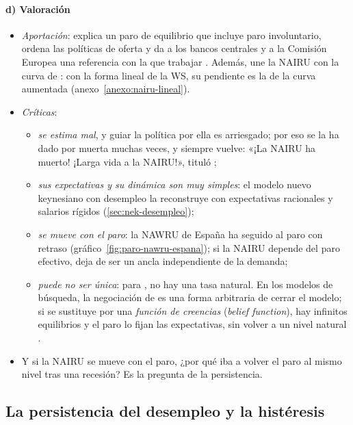 \documentclass[11pt]{article}
\begin{document}
\paragraph{d) Valoración}

\begin{itemize}
\item \emph{Aportación}: explica un paro de equilibrio que incluye paro involuntario, ordena las políticas de oferta y da a los bancos centrales y a la Comisión Europea una referencia con la que trabajar  . Además, une la NAIRU con la curva de : con la forma lineal de la WS, su pendiente es la de la curva aumentada (anexo~\ref{anexo:nairu-lineal}).
\item \emph{Críticas}:
  \begin{itemize}
  \item \emph{se estima mal}, y guiar la política por ella es arriesgado; por eso se la ha dado por muerta muchas veces, y siempre vuelve: «¡La NAIRU ha muerto! ¡Larga vida a la NAIRU!», tituló \textcite{Jimeno2018NAIRU};
  \item \emph{sus expectativas y su dinámica son muy simples}: el modelo nuevo keynesiano con desempleo la reconstruye con expectativas racionales y salarios rígidos (\ref{sec:nek-desempleo});
  \item \emph{se mueve con el paro}: la NAWRU de España ha seguido al paro con retraso (gráfico~\ref{fig:paro-nawru-espana}); si la NAIRU depende del paro efectivo, deja de ser un ancla independiente de la demanda;
  \item \emph{puede no ser única}: para \textcite{Farmer2010Expectations}, no hay una tasa natural. En los modelos de búsqueda, la negociación de  es una forma arbitraria de cerrar el modelo; si se sustituye por una \emph{función de creencias} (\emph{belief function}), hay infinitos equilibrios y el paro lo fijan las expectativas, sin volver a un nivel natural\nocite{Farmer2013Natural} .
  \end{itemize}
\item Y si la NAIRU se mueve con el paro, ¿por qué iba a volver el paro al mismo nivel tras una recesión? Es la pregunta de la persistencia.
\end{itemize}

\subsection{La persistencia del desempleo y la histéresis}\label{sec:persistencia}
\end{document}
